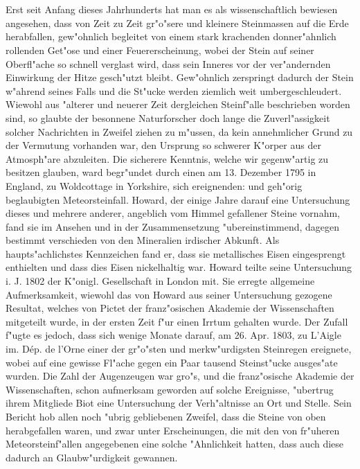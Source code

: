 \documentclass[a4paper, 11pt, oneside]{article}
\begin{document}
\section*{}
\paragraph{}
Erst seit Anfang dieses Jahrhunderts hat man es als wissenschaftlich bewiesen angesehen, dass von Zeit zu Zeit gr"o"sere und kleinere Steinmassen auf die Erde herabfallen, gew"ohnlich begleitet von einem stark krachenden donner"ahnlich rollenden Get"ose und einer Feuererscheinung, wobei der Stein auf seiner Oberfl"ache so schnell verglast wird, dass sein Inneres vor der ver"andernden Einwirkung der Hitze gesch"utzt bleibt. Gew"ohnlich zerspringt dadurch der Stein w"ahrend seines Falls und die St"ucke werden ziemlich weit umbergeschleudert. Wiewohl aus "alterer und neuerer Zeit dergleichen Steinf"alle beschrieben worden sind, so glaubte der besonnene Naturforscher doch lange die Zuverl"assigkeit solcher Nachrichten in Zweifel ziehen zu m"ussen, da kein annehmlicher Grund zu der Vermutung vorhanden war, den Ursprung so schwerer K"orper aus der Atmosph"are abzuleiten. Die sicherere Kenntnis, welche wir gegenw"artig zu besitzen glauben, ward begr"undet durch einen am 13. Dezember 1795 in England, zu Woldcottage in Yorkshire, sich ereignenden: und geh"orig beglaubigten Meteorsteinfall. Howard, der einige Jahre darauf eine Untersuchung dieses und mehrere anderer, angeblich vom Himmel gefallener Steine vornahm, fand sie im Ansehen und in der Zusammensetzung "ubereinstimmend, dagegen bestimmt verschieden von den Mineralien irdischer Abkunft. Als haupts"achlichstes Kennzeichen fand er, dass sie metallisches Eisen eingesprengt enthielten und dass dies Eisen nickelhaltig war. Howard teilte seine Untersuchung i. J. 1802 der K"onigl. Gesellschaft in London mit. Sie erregte allgemeine Aufmerksamkeit, wiewohl das von Howard aus seiner Untersuchung gezogene Resultat, welches von Pictet der franz"osischen Akademie der Wissenschaften mitgeteilt wurde, in der ersten Zeit f"ur einen Irrtum gehalten wurde. Der Zufall f"ugte es jedoch, dass sich wenige Monate darauf, am 26. Apr. 1803, zu L'Aigle im. Dép. de l’Orne einer der gr"o"sten und merkw"urdigsten Steinregen ereignete, wobei auf eine gewisse Fl"ache gegen ein Paar tausend Steinst"ucke ausges"ate wurden. Die Zahl der Augenzeugen war gro"s, und die franz"osische Akademie der Wissenschaften, schon aufmerksam geworden auf solche Ereignisse, "ubertrug ihrem Mitgliede Biot eine Untersuchung der Verh"altnisse an Ort und Stelle. Sein Bericht hob allen noch "ubrig gebliebenen Zweifel, dass die Steine von oben herabgefallen waren, und zwar unter Erscheinungen, die mit den von fr"uheren Meteorsteinf"allen angegebenen eine solche "Ahnlichkeit hatten, dass auch diese dadurch an Glaubw"urdigkeit gewannen.
\end{document}
